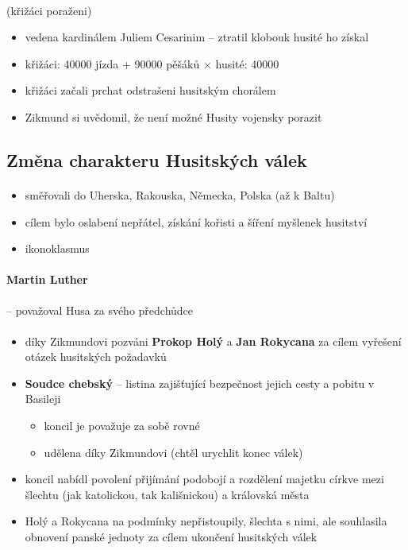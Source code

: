\paragraph{} (křižáci poraženi)
\begin{itemize}
\item vedena kardinálem Juliem Cesarinim -- ztratil klobouk \ra husité ho získal
\item křižáci: 40000 jízda + 90000 pěšáků $\times$ husité: 40000
\item křižáci začali prchat odstrašeni husitským chorálem
\item[\ra] Zikmund si uvědomil, že není možné Husity vojensky porazit
\end{itemize}

\subsection{Změna charakteru Husitských válek}
\paragraph{}
\begin{itemize}
\item směřovali do Uherska, Rakouska, Německa, Polska (až k Baltu)
\item cílem bylo oslabení nepřátel, získání kořisti a šíření myšlenek husitství
\item ikonoklasmus
\end{itemize}

\paragraph{Martin Luther} -- považoval Husa za svého předchůdce

\paragraph{}
\begin{itemize}
\item díky Zikmundovi pozváni \textbf{Prokop Holý} a \textbf{Jan Rokycana} za cílem vyřešení otázek husitských požadavků
\item \textbf{Soudce chebský} -- listina zajišťující bezpečnost jejich cesty a pobitu v Basileji
\begin{itemize}
\item koncil je považuje za sobě rovné
\item udělena díky Zikmundovi (chtěl urychlit konec válek)
\end{itemize}
\item koncil nabídl povolení přijímání podobojí a rozdělení majetku církve mezi šlechtu (jak katolickou, tak kališnickou) a královská města 
\item Holý a Rokycana na podmínky nepřistoupily, šlechta s nimi, ale souhlasila \ra obnovení panské jednoty za cílem ukončení husitských válek
\end{itemize}

